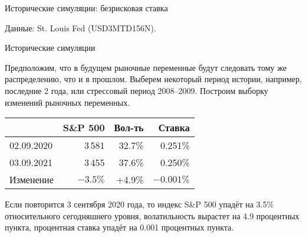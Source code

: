\documentclass{beamer}
\begin{document}
\begin{frame}{Исторические симуляции: безрисковая ставка}
\centering
{}

\centering
\small Данные: St. Louis Fed (USD3MTD156N).
\end{frame}



\begin{frame}{Исторические симуляции}

\justify
Предположим, что в будущем рыночные переменные будут следовать тому же распределению, что и в прошлом. Выберем некоторый период истории, например, последние 2 года, или стрессовый период 2008--2009. Построим выборку изменений рыночных переменных.
 
\justify
\centering
\begin{tabular}{l|r|r|r}
           & S\&P 500 & Вол-ть   & Ставка \\ \hline
02.09.2020 & 3\,581   & 32.7\%   & 0.251\% \\
03.09.2021 & 3\,455   & 37.6\%   & 0.250\% \\ \hline
Изменение  & $-3.5\%$ & +4.9\%   & $-0.001\%$ 
\end{tabular}

\justify
Если повторится 3 сентября 2020 года, то индекс S\&P 500 упадёт на 3.5\% относительного \alert{сегодняшнего} уровня, волатильность вырастет на 4.9 процентных пункта, процентная ставка упадёт на 0.001 процентных пункта.

\end{frame}
\end{document}
